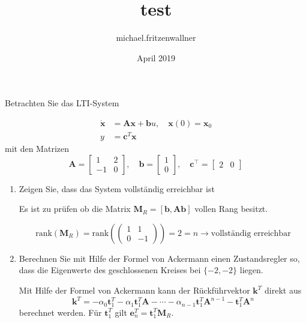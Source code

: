 \documentclass{article}
\title{test}
\author{michael.fritzenwallner }
\date{April 2019}
\begin{document}


\begin{task}
Betrachten Sie das LTI-System

$$ 
\begin{aligned} \dot{\mathbf{x}} &=\mathbf{A x}+\mathbf{b} u, \quad \mathbf{x}(0)=\mathbf{x}_{0} \\ y &=\mathbf{c}^{T} \mathbf{x} \end{aligned}
 $$
mit den Matrizen
 $$ 
\mathbf{A}=\left[\begin{array}{cc}{1} & {2} \\ {-1} & {0}\end{array}\right], \quad \mathbf{b}=\left[\begin{array}{l}{1} \\ {0}\end{array}\right], \quad \mathbf{c}^{\top}=\left[\begin{array}{ll}{2} & {0}\end{array}\right]
 $$
 \begin{enumerate}[i]
  \item Zeigen Sie, dass das System vollständig erreichbar ist
\begin{solution}
Es ist zu prüfen ob die Matrix $\mathbf{M}_R = \left[\mathbf{b}, \mathbf{Ab} \right]$ vollen Rang besitzt.

\[ \text{rank}\left(\mathbf{M}_R\right) = \text{rank}\left(\begin{pmatrix} 1 & 1 \\ 0 & -1 \end{pmatrix}\right)=2=n \rightarrow \text{vollständig erreichbar}\]
\end{solution}
  \item Berechnen Sie mit Hilfe der Formel von Ackermann einen Zustandsregler so, dass
die Eigenwerte des geschlossenen Kreises bei $\{-2,-2\}$ liegen.
\begin{solution}
Mit Hilfe der Formel von Ackermann kann der Rückführvektor $\mathbf{k}^{T}$ direkt aus
\[ 
\mathbf{k}^{T}=-\alpha_{0} \mathbf{t}_{1}^{T}-\alpha_{1} \mathbf{t}_{1}^{T} \mathbf{A}-\cdots-\alpha_{n-1} \mathbf{t}_{1}^{T} \mathbf{A}^{n-1}-\mathbf{t}_{1}^{T} \mathbf{A}^{n}
 \]
 berechnet werden. Für $\mathbf{t}_{1}^{T}$ gilt $\mathbf{e}_{n}^{T}=\mathbf{t}_{1}^{T} \mathbf{M}_{R}$.
 

\end{solution}
\end{enumerate}
\end{task}
\end{document}
